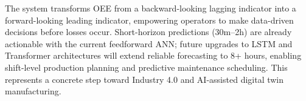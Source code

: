 \documentclass[a4paper,11pt]{article}
\begin{document}
The system transforms OEE from a backward-looking lagging indicator into a forward-looking leading indicator, empowering operators to make data-driven decisions before losses occur. Short-horizon predictions (30m--2h) are already actionable with the current feedforward ANN; future upgrades to LSTM and Transformer architectures will extend reliable forecasting to 8+ hours, enabling shift-level production planning and predictive maintenance scheduling. This represents a concrete step toward Industry 4.0 and AI-assisted digital twin manufacturing.
\end{document}
